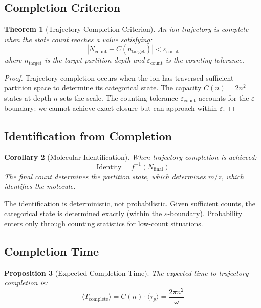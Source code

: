 \documentclass[twocolumn,10pt]{article}
\newtheorem{theorem}{Theorem}[section]
\newtheorem{proposition}[theorem]{Proposition}
\newtheorem{corollary}[theorem]{Corollary}
\newcommand{\eps}{\varepsilon}
\begin{document}
\subsection{Completion Criterion}

\begin{theorem}[Trajectory Completion Criterion]
\label{thm:completion}
An ion trajectory is complete when the state count reaches a value satisfying:
\begin{equation}
    |N_{\text{count}} - C(n_{\text{target}})| < \eps_{\text{count}}
\end{equation}
where $n_{\text{target}}$ is the target partition depth and $\eps_{\text{count}}$ is the counting tolerance.
\end{theorem}

\begin{proof}
Trajectory completion occurs when the ion has traversed sufficient partition space to determine its categorical state. The capacity $C(n) = 2n^2$ states at depth $n$ sets the scale. The counting tolerance $\eps_{\text{count}}$ accounts for the $\eps$-boundary: we cannot achieve exact closure but can approach within $\eps$.
\end{proof}

\subsection{Identification from Completion}

\begin{corollary}[Molecular Identification]
When trajectory completion is achieved:
\begin{equation}
    \text{Identity} = f^{-1}(N_{\text{final}})
\end{equation}
The final count determines the partition state, which determines $m/z$, which identifies the molecule.
\end{corollary}

The identification is deterministic, not probabilistic. Given sufficient counts, the categorical state is determined exactly (within the $\eps$-boundary). Probability enters only through counting statistics for low-count situations.

\subsection{Completion Time}

\begin{proposition}[Expected Completion Time]
The expected time to trajectory completion is:
\begin{equation}
    \langle T_{\text{complete}} \rangle = C(n) \cdot \langle\tau_p\rangle = \frac{2\pi n^2}{\omega}
\end{equation}
\end{proposition}
\end{document}
